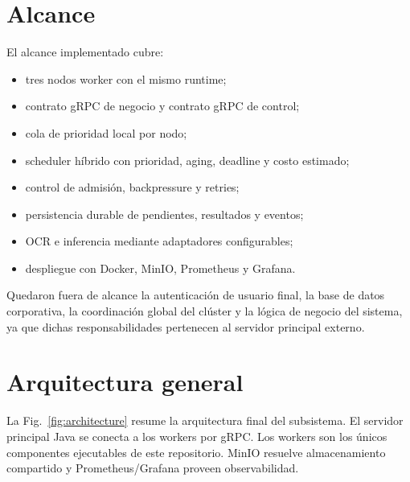 \documentclass[conference]{IEEEtran}
\begin{document}
\section{Alcance}
El alcance implementado cubre:
\begin{itemize}[leftmargin=*]
\item tres nodos worker con el mismo runtime;
\item contrato gRPC de negocio y contrato gRPC de control;
\item cola de prioridad local por nodo;
\item scheduler híbrido con prioridad, aging, deadline y costo estimado;
\item control de admisión, backpressure y retries;
\item persistencia durable de pendientes, resultados y eventos;
\item OCR e inferencia mediante adaptadores configurables;
\item despliegue con Docker, MinIO, Prometheus y Grafana.
\end{itemize}

Quedaron fuera de alcance la autenticación de usuario final, la base de datos corporativa, la coordinación global del clúster y la lógica de negocio del sistema, ya que dichas responsabilidades pertenecen al servidor principal externo.

\section{Arquitectura general}
La Fig.~\ref{fig:architecture} resume la arquitectura final del subsistema. El servidor principal Java se conecta a los workers por gRPC. Los workers son los únicos componentes ejecutables de este repositorio. MinIO resuelve almacenamiento compartido y Prometheus/Grafana proveen observabilidad.
\end{document}
